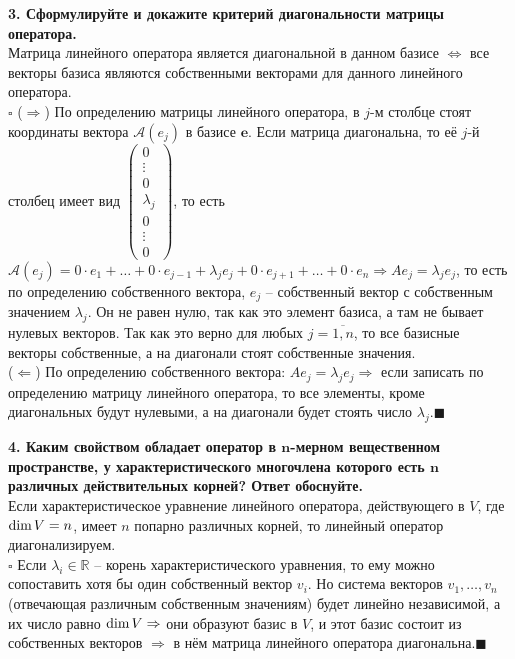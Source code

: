 \documentclass[11pt,a4paper]{article}
\newcommand{\R}{\mathbb{R}}
\newcommand{\e}{\mathbf{e}}
\newcommand{\A}{\mathcal{A}}
\newcommand{\Dim}[1]{\mathrm{dim}\hspace{0.5mm}#1}
\newcommand{\proof}{$\square$ }
\newcommand{\qed}{\hfill$\blacksquare$}
\begin{document}
\textbf{3. Сформулируйте и докажите критерий диагональности матрицы оператора.\\}
Матрица линейного оператора является диагональной в данном базисе $\Leftrightarrow$ все векторы базиса являются собственными векторами для данного линейного оператора.\\
\proof ($\Rightarrow$) По определению матрицы линейного оператора, в $j$-м столбце стоят координаты вектора $\A(e_j)$ в базисе $\e$. Если матрица диагональна, то её $j$-й столбец имеет вид
$\left( \begin{matrix}
0 \\
\vdots \\
0 \\
\lambda_j \\
0 \\
\vdots \\
0
\end{matrix} \right)$, то есть $\A(e_j) = 0 \cdot e_1 + \hdots + 0 \cdot e_{j - 1} + \lambda_j e_j + 0 \cdot e_{j+1} + \hdots + 0 \cdot e_n \Rightarrow Ae_j = \lambda_j e_j$, то есть по определению собственного вектора, $e_j$ -- собственный вектор с собственным значением $\lambda_j$. Он не равен нулю, так как это элемент базиса, а там не бывает нулевых векторов. Так как это верно для любых $j = \overline{1, n}$, то все базисные векторы собственные, а на диагонали стоят собственные значения.\\
($\Leftarrow$) По определению собственного вектора: $Ae_j = \lambda_j e_j \Rightarrow$ если записать по определению матрицу линейного оператора, то все элементы, кроме диагональных будут нулевыми, а на диагонали будет стоять число $\lambda_j$.\qed

\textbf{4. Каким свойством обладает оператор в $\boldsymbol{n}$-мерном вещественном пространстве, у характеристического многочлена которого есть $\boldsymbol{n}$ различных действительных корней? Ответ обоснуйте.\\}
Если характеристическое уравнение линейного оператора, действующего в $V$, где $\Dim{V} = n$, имеет $n$ попарно различных корней, то линейный оператор диагонализируем.\\
\proof Если $\lambda_i \in \R$ -- корень характеристического уравнения, то ему можно сопоставить хотя бы один собственный вектор $v_i$. Но система векторов $v_1, \hdots, v_n$ (отвечающая различным собственным значениям) будет линейно независимой, а их число равно $\Dim{V} \Rightarrow$ они образуют базис в $V$, и этот базис состоит из собственных векторов $\Rightarrow$ в нём матрица линейного оператора диагональна.\qed
\end{document}
